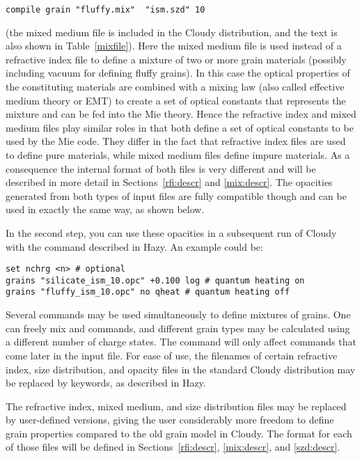 \begin{verbatim}
compile grain "fluffy.mix"  "ism.szd" 10
\end{verbatim}

\noindent (the mixed medium file  is
included in the Cloudy distribution, and the text is also shown in
Table~\ref{mixfile}). Here the mixed medium file is used instead of a
refractive index file to define a mixture of two or more grain materials
(possibly including vacuum for defining fluffy grains). In this case the
optical properties of the constituting materials are combined with a mixing
law (also called effective medium theory or EMT) to create a set of optical
constants that represents the mixture and can be fed into the Mie theory.
Hence the refractive index and mixed medium files play similar roles in that
both define a set of optical constants to be used by the Mie code. They differ
in the fact that refractive index files are used to define pure materials,
while mixed medium files define impure materials. As a consequence the
internal format of both files is very different and will be described in more
detail in Sections~\ref{rfi:descr} and \ref{mix:descr}. The opacities
generated from both types of input files are fully compatible though and can
be used in exactly the same way, as shown below.

In the second step, you can use these opacities in a subsequent run of Cloudy
with the  command described in Hazy. An example could be:

\begin{verbatim}
set nchrg <n> # optional
grains "silicate_ism_10.opc" +0.100 log # quantum heating on
grains "fluffy_ism_10.opc" no qheat # quantum heating off
\end{verbatim}

Several  commands may be used simultaneously to define
mixtures of grains. One can freely mix  and
 commands, and different grain types may be calculated using
a different number of charge states. The  command will
only affect  commands that come later in the input file. For
ease of use, the filenames of certain refractive index, size distribution, and
opacity files in the standard Cloudy distribution may be replaced by keywords,
as described in Hazy.


The refractive index, mixed medium, and size distribution files may be
replaced by user-defined versions, giving the user considerably more freedom
to define grain properties compared to the old grain model in Cloudy. The
format for each of those files will be defined in Sections~\ref{rfi:descr},
\ref{mix:descr}, and \ref{szd:descr}.

